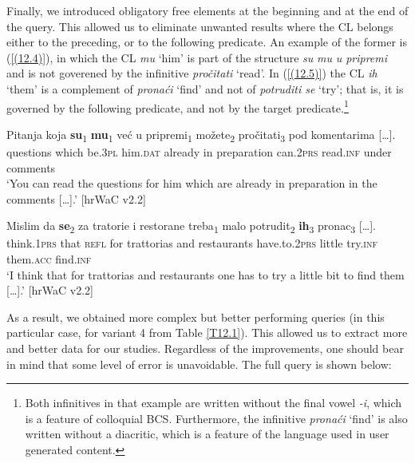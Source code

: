 \noindent Finally, we introduced obligatory free elements at the beginning and at the end of the query. This allowed us to eliminate unwanted results where the CL belongs either to the preceding, or to the following predicate. An example of the former is (\ref{(12.4)}), in which the CL \textit{mu} ‘him’ is part of the structure \textit{su} \textit{mu} \textit{u pripremi} and is not goverened by the infinitive \textit{pročitati} ‘read’. In (\ref{(12.5)}) the CL \textit{ih} ‘them’ is a complement of \textit{pronaći} ‘find’ and not of \textit{potruditi se} ‘try’; that is, it is governed by the following predicate, and not by the target predicate.\footnote{Both infinitives in that example are written without the final vowel \textit{-i}, which is a feature of colloquial BCS. Furthermore, the infinitive \textit{pronaći} ‘find’ is also written without a diacritic, which is a feature of the language used in user generated content.}

\begin{exe}
\ex\label{(12.4)}
\gll Pitanja koja \textbf{su}\textsubscript{1}  \textbf{mu}\textsubscript{1}  već u pripremi\textsubscript{1}  možete\textsubscript{2} pročitati\textsubscript{3} pod {komentarima [\dots].} \\
questions which be.\textsc{3pl} him.\textsc{dat} already in preparation can.\textsc{2prs} read.\textsc{inf} under comments \\
\glt ‘You can read the questions for him which are already in preparation in the comments [\dots].’
\hfill [hrWaC v2.2]

\ex\label{(12.5)}
\gll Mislim da \textbf{se}\textsubscript{2} za tratorie i  restorane treba\textsubscript{1}  malo potrudit\textsubscript{2} \textbf{ih}\textsubscript{3} {pronac\textsubscript{3} [\dots].}\\
think.\textsc{1prs} that \textsc{refl} for trattorias and restaurants have.to.\textsc{2prs} little try.\textsc{inf} them.\textsc{acc} find.\textsc{inf} \\
\glt ‘I think that for trattorias and restaurants one has to try a little bit to find them [\dots].’
\hfill [hrWaC v2.2]
\end{exe}


\noindent As a result, we obtained more complex but better performing queries (in this particular case, for variant 4 from Table \ref{T12.1}). This allowed us to extract more and better data for our studies. Regardless of the improvements, one should bear in mind that some level of error is unavoidable. The full query is shown below:


